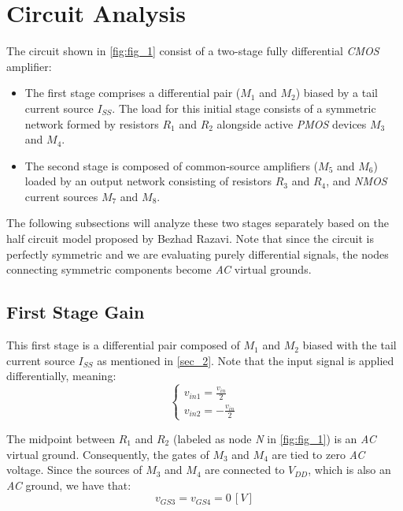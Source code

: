 \documentclass[12pt,a4paper]{article}
\begin{document}
\section{Circuit Analysis}                                      \label{sec_2}
The circuit shown in \autoref{fig:fig_1} consist of a two-stage fully differential \textit{CMOS} amplifier:
\begin{itemize}
    \item The first stage comprises a differential pair ($M_{1}$ and $M_{2}$) biased by a tail current source $I_{SS}$. The load for this initial stage consists of a symmetric network formed by resistors $R_{1}$ and $R_{2}$ alongside active \textit{PMOS} devices $M_{3}$ and $M_{4}$.
    \item The second stage is composed of common-source amplifiers ($M_{5}$ and $M_{6}$) loaded by an output network consisting of resistors $R_{3}$ and $R_{4}$, and \textit{NMOS} current sources $M_{7}$ and $M_{8}$.
\end{itemize}

The following subsections will analyze these two stages separately based on the half circuit model proposed by Bezhad Razavi. \cite{b1} Note that since the circuit is perfectly symmetric and we are evaluating purely differential signals, the nodes connecting symmetric components become \textit{AC} virtual grounds.



\subsection{First Stage Gain}                                   \label{sec_2.1}
This first stage is a differential pair composed of $M_{1}$ and $M_{2}$ biased with the tail current source $I_{SS}$ as mentioned in \autoref{sec_2}. Note that the input signal is applied differentially, meaning:
\begin{equation}
    \begin{cases}
        v_{in1} =  \frac{v_{in}}{2} \\
        v_{in2} = -\frac{v_{in}}{2}
    \end{cases}
    \label{eq_1}
\end{equation}

The midpoint between $R_{1}$ and $R_{2}$ (labeled as node \textit{N} in \autoref{fig:fig_1}) is an \textit{AC} virtual ground. Consequently, the gates of $M_{3}$ and $M_{4}$ are tied to zero \textit{AC} voltage. Since the sources of $M_{3}$ and $M_{4}$ are connected to $V_{DD}$, which is also an \textit{AC} ground, we have that:
\begin{equation}
    v_{GS3} = v_{GS4} = 0 \, [V]
    \label{eq_2}
\end{equation}
 
\end{document}
